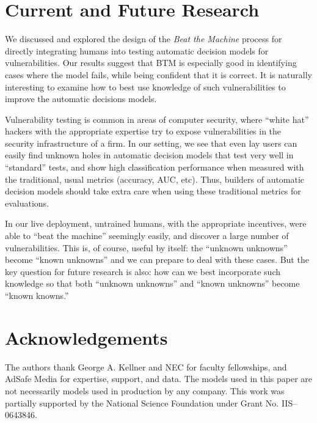 \section{Current and Future Research}

We discussed and explored the design of the \emph{Beat the Machine} process for directly integrating humans into testing automatic decision models for vulnerabilities. Our results suggest that BTM is especially good in identifying cases where the model fails, while being confident that it is correct.  It is naturally interesting to examine how to best use knowledge of such vulnerabilities to improve the automatic decisions models. 


Vulnerability testing is common in areas of computer security, where ``white hat'' hackers with the appropriate expertise try to expose vulnerabilities in the security infrastructure of a firm. In our setting, we see that even lay users can easily find unknown holes in automatic decision models that test very well in ``standard'' tests, and show high classification performance when measured with the traditional, usual metrics (accuracy, AUC, etc).  Thus, builders of automatic decision models should take extra care when using these
traditional metrics for evaluations.

In our live deployment, untrained humans, with the appropriate incentives, were able to ``beat the machine'' seemingly easily, and discover a large number of vulnerabilities. This is, of course, useful by itself: the ``unknown unknowns'' become ``known unknowns'' and we can prepare to deal with these cases. But the key question for future research is also: how can we best incorporate such knowledge so that both ``unknown unknowns'' and ``known unknowns'' become ``known knowns.''

\section*{Acknowledgements}

The authors thank George A. Kellner and NEC for faculty fellowships,
and AdSafe Media for expertise, support, and data.  The models used in
this paper are not necessarily models used in production by any
company. This work was partially supported by the National Science 
Foundation under Grant No. IIS–0643846.




